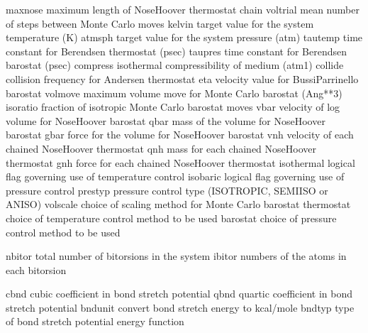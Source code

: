 \documentclass[letterpaper,11pt,english]{sphinxmanual}
\begin{document}
\begin{sphinxVerbatim}[commandchars=\\\{\}]
maxnose         maximum length of Nose\PYGZhy{}Hoover thermostat chain
voltrial        mean number of steps between Monte Carlo moves
kelvin          target value for the system temperature (K)
atmsph          target value for the system pressure (atm)
tautemp         time constant for Berendsen thermostat (psec)
taupres         time constant for Berendsen barostat (psec)
compress        isothermal compressibility of medium (atm\PYGZhy{}1)
collide         collision frequency for Andersen thermostat
eta             velocity value for Bussi\PYGZhy{}Parrinello barostat
volmove         maximum volume move for Monte Carlo barostat (Ang**3)
isoratio        fraction of isotropic Monte Carlo barostat moves
vbar            velocity of log volume for Nose\PYGZhy{}Hoover barostat
qbar            mass of the volume for Nose\PYGZhy{}Hoover barostat
gbar            force for the volume for Nose\PYGZhy{}Hoover barostat
vnh             velocity of each chained Nose\PYGZhy{}Hoover thermostat
qnh             mass for each chained Nose\PYGZhy{}Hoover thermostat
gnh             force for each chained Nose\PYGZhy{}Hoover thermostat
isothermal      logical flag governing use of temperature control
isobaric        logical flag governing use of pressure control
prestyp         pressure control type (ISOTROPIC, SEMIISO or ANISO)
volscale        choice of scaling method for Monte Carlo barostat
thermostat      choice of temperature control method to be used
barostat        choice of pressure control method to be used
\end{sphinxVerbatim}

\sphinxAtStartPar
{}

\begin{sphinxVerbatim}[commandchars=\\\{\}]
nbitor          total number of bitorsions in the system
ibitor          numbers of the atoms in each bitorsion
\end{sphinxVerbatim}

\sphinxAtStartPar
{}

\begin{sphinxVerbatim}[commandchars=\\\{\}]
cbnd            cubic coefficient in bond stretch potential
qbnd            quartic coefficient in bond stretch potential
bndunit         convert bond stretch energy to kcal/mole
bndtyp          type of bond stretch potential energy function
\end{sphinxVerbatim}
\end{document}
